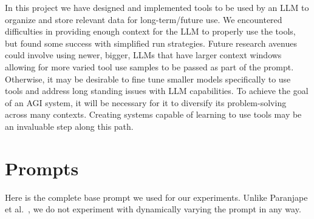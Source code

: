 \documentclass{article}
\begin{document}
In this project we have designed and implemented tools to be used by an LLM to organize and store relevant data for long-term/future use.
We encountered difficulties in providing enough context for the LLM to properly use the tools, but found some success with simplified run strategies.
Future research avenues could involve using newer, bigger, LLMs that have larger context windows allowing for more varied tool use samples to be passed as part of the prompt.
Otherwise, it may be desirable to fine tune smaller models specifically to use tools and address long standing issues with LLM capabilities.
To achieve the goal of an AGI system, it will be necessary for it to diversify its problem-solving across many contexts. 
Creating systems capable of learning to use tools may be an invaluable step along this path.





\appendix

\section{Prompts}\label{section:prompts}

Here is the complete base prompt we used for our experiments. Unlike Paranjape et al.~\cite{paranjape2023art}, we do not experiment with dynamically varying the prompt in any way.
\end{document}
